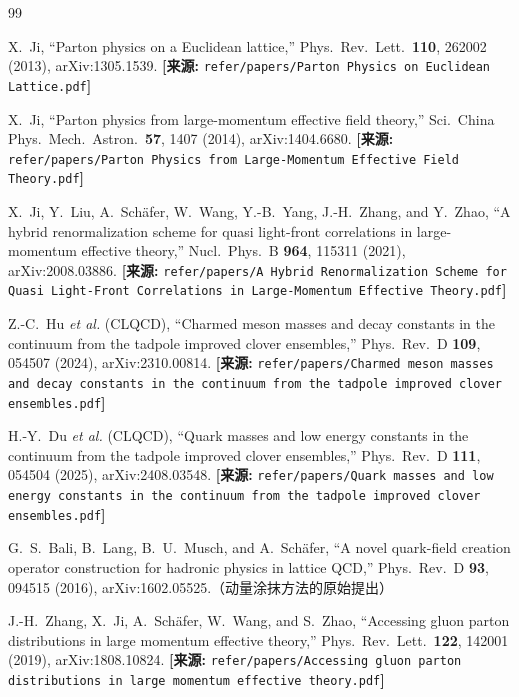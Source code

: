 \documentclass[12pt,a4paper]{ctexart}
\theoremstyle{definition}
\begin{document}
\begin{thebibliography}{99}

X.~Ji,
``Parton physics on a Euclidean lattice,''
Phys.\ Rev.\ Lett.\ \textbf{110}, 262002 (2013), arXiv:1305.1539.
\quad\textbf{[来源:} \texttt{refer/papers/Parton Physics on Euclidean Lattice.pdf}\textbf{]}

X.~Ji,
``Parton physics from large-momentum effective field theory,''
Sci.\ China Phys.\ Mech.\ Astron.\ \textbf{57}, 1407 (2014), arXiv:1404.6680.
\quad\textbf{[来源:} \texttt{refer/papers/Parton Physics from Large-Momentum Effective Field Theory.pdf}\textbf{]}

X.~Ji, Y.~Liu, A.~Sch\"afer, W.~Wang, Y.-B.~Yang, J.-H.~Zhang, and Y.~Zhao,
``A hybrid renormalization scheme for quasi light-front correlations in large-momentum effective theory,''
Nucl.\ Phys.\ B \textbf{964}, 115311 (2021), arXiv:2008.03886.
\quad\textbf{[来源:} \texttt{refer/papers/A Hybrid Renormalization Scheme for Quasi Light-Front Correlations in Large-Momentum Effective Theory.pdf}\textbf{]}


Z.-C.~Hu \textit{et al.} (CLQCD),
``Charmed meson masses and decay constants in the continuum from the tadpole improved clover ensembles,''
Phys.\ Rev.\ D \textbf{109}, 054507 (2024), arXiv:2310.00814.
\quad\textbf{[来源:} \texttt{refer/papers/Charmed meson masses and decay constants in the continuum from the tadpole improved clover ensembles.pdf}\textbf{]}

H.-Y.~Du \textit{et al.} (CLQCD),
``Quark masses and low energy constants in the continuum from the tadpole improved clover ensembles,''
Phys.\ Rev.\ D \textbf{111}, 054504 (2025), arXiv:2408.03548.
\quad\textbf{[来源:} \texttt{refer/papers/Quark masses and low energy constants in the continuum from the tadpole improved clover ensembles.pdf}\textbf{]}


G.~S.~Bali, B.~Lang, B.~U.~Musch, and A.~Sch\"afer,
``A novel quark-field creation operator construction for hadronic physics in lattice QCD,''
Phys.\ Rev.\ D \textbf{93}, 094515 (2016), arXiv:1602.05525.（动量涂抹方法的原始提出）

J.-H.~Zhang, X.~Ji, A.~Sch\"afer, W.~Wang, and S.~Zhao,
``Accessing gluon parton distributions in large momentum effective theory,''
Phys.\ Rev.\ Lett.\ \textbf{122}, 142001 (2019), arXiv:1808.10824.
\quad\textbf{[来源:} \texttt{refer/papers/Accessing gluon parton distributions in large momentum effective theory.pdf}\textbf{]}

\end{thebibliography}
\end{document}
